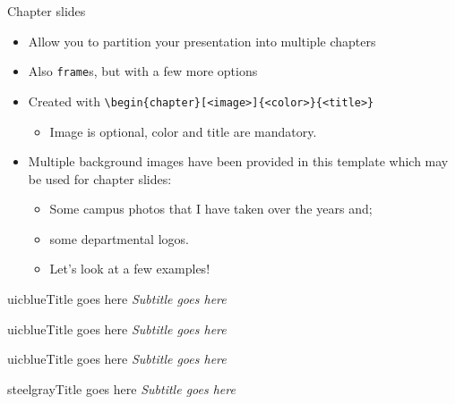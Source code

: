 \documentclass{beamer}
\begin{document}
\begin{frame}[fragile]{Chapter slides}
\begin{itemize}
\item Allow you to partition your presentation into multiple chapters
\item Also \verb|frame|s, but with a few more options
\item Created with \verb|\begin{chapter}[<image>]{<color>}{<title>}|
  \begin{itemize}
  \item Image is optional, color and title are mandatory.
  \end{itemize}
\item Multiple background images have been provided in this template which may be used for chapter slides:
  \begin{itemize}
  \item Some campus photos that I have taken over the years and;
  \item some departmental logos.
  \item Let's look at a few examples!
  \end{itemize}
\end{itemize}
\end{frame}


\begin{chapter}{uicblue}{Title goes here}
\textit{Subtitle goes here}
\end{chapter}

\begin{chapter}{uicblue}{Title goes here}
\textit{Subtitle goes here}
\end{chapter}

\begin{chapter}{uicblue}{Title goes here}
\textit{Subtitle goes here}
\end{chapter}

\begin{chapter}{steelgray}{Title goes here}
\textit{Subtitle goes here}
\end{chapter}
\end{document}
